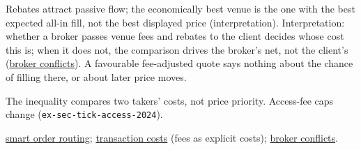\begin{qfresult}
Rebates attract passive flow; the economically best venue is the one with the best expected all-in fill, not the best displayed price (interpretation). Interpretation: whether a broker passes venue fees and rebates to the client decides whose cost this is; when it does not, the comparison drives the broker's net, not the client's (\hyperref[def:broker-agency-conflicts]{broker conflicts}). A favourable fee-adjusted quote says nothing about the chance of filling there, or about later price moves.

 The inequality compares two takers' costs, not price priority. Access-fee caps change (\nolinkurl{ex-sec-tick-access-2024}).

 \hyperref[def:smart-order-routing]{smart order routing}; \hyperref[def:transaction-costs]{transaction costs} (fees as explicit costs); \hyperref[def:broker-agency-conflicts]{broker conflicts}.

\end{qfresult}

